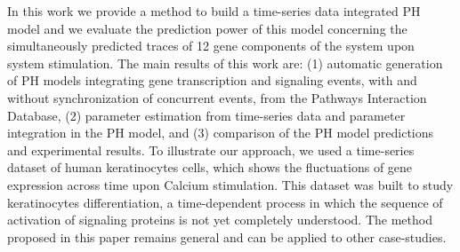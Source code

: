 In this work we provide a method to build a time-series data integrated PH model and we evaluate 
the prediction power of this model concerning the simultaneously predicted traces of 12 gene components of the system upon system stimulation.
The main  results of this work are: (1) automatic generation of PH models integrating gene transcription and signaling events, 
with and without synchronization of concurrent events, from the Pathways Interaction Database, 
(2) parameter estimation from time-series data and parameter integration in the PH model, and
(3) comparison of the PH model predictions and experimental results.
To illustrate our approach, we used a time-series dataset of human keratinocytes cells, which shows
 the fluctuations of gene expression across time upon Calcium stimulation.
This dataset was built to study keratinocytes differentiation, a time-dependent
 process in which the sequence of activation of signaling proteins is not yet completely understood.
The method proposed in this paper remains general and can be applied to other case-studies.



 
